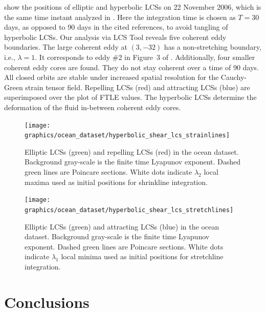 \documentclass{elsarticle}
\begin{document}
 show the positions of elliptic and hyperbolic LCSs on 22 November 2006, which is the same time instant analyzed in \citet{haller13:_coher_lagran,beron-vera13:_objec_agulh}. Here the integration time is chosen as $T = 30$ days, as opposed to 90 days in the cited references, to avoid tangling of hyperbolic LCSs. Our analysis via LCS Tool reveals five coherent eddy boundaries. The large coherent eddy at $(3,-32)$ has a non-stretching boundary, i.e., $\lambda = 1$. It corresponds to eddy \#2 in Figure~3 of \citet{beron-vera13:_objec_agulh}. Additionally, four smaller coherent eddy cores are found. They do not stay coherent over a time of 90 days. All closed orbits are stable under increased spatial resolution for the Cauchy-Green strain tensor field. Repelling LCSs (red) and attracting LCSs (blue) are superimposed over the plot of FTLE values. The hyperbolic LCSs determine the deformation of the fluid in-between coherent eddy cores.

\begin{figure}
\begin{center}
\texttt{[image: graphics/ocean\_dataset/hyperbolic\_shear\_lcs\_strainlines]}
\end{center}
\caption{Elliptic LCSs (green) and repelling LCSs (red) in the ocean dataset. Background gray-scale is the finite time Lyapunov exponent. Dashed green lines are Poincare sections. White dots indicate $\lambda_2$ local maxima used as initial positions for shrinkline integration.}
\label{f:ocean dataset hyperbolic shear lcs details strainline}
\end{figure}

\begin{figure}
\begin{center}
\texttt{[image: graphics/ocean\_dataset/hyperbolic\_shear\_lcs\_stretchlines]}
\end{center}
\caption{Elliptic LCSs (green) and attracting LCSs (blue) in the ocean dataset. Background gray-scale is the finite time Lyapunov exponent. Dashed green lines are Poincare sections. White dots indicate $\lambda_1$ local minima used as initial positions for stretchline integration.}
\label{f:ocean dataset hyperbolic shear lcs details stretchline}
\end{figure}

\section{Conclusions}
\end{document}
